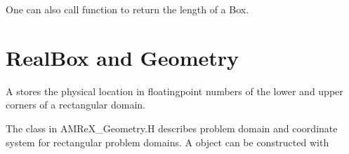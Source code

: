 \documentclass[letterpaper,10pt,english]{sphinxmanual}
\begin{document}
\sphinxAtStartPar
One can also call function  to return the length of a Box.


\section{RealBox and Geometry}
\label{\detokenize{Basics:realbox-and-geometry}}\label{\detokenize{Basics:sec-basics-geom}}
\sphinxAtStartPar
A  stores the physical location in floating\sphinxhyphen{}point numbers of the
lower and upper corners of a rectangular domain.

\sphinxAtStartPar
The  class in AMReX\_Geometry.H describes problem domain and
coordinate system for rectangular problem domains. A  object can
be constructed with

\begin{sphinxVerbatim}[commandchars=\\\{\}]
        
                           
                                  
                                 

        
             
\end{sphinxVerbatim}
\end{document}
